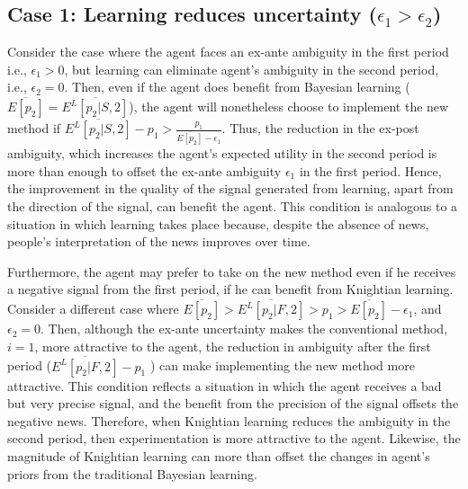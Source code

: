 \documentclass[11pt]{article} %
\theoremstyle{exampstyle}
\begin{document}
\subsection{Case 1: Learning reduces uncertainty ($\epsilon_1 > \epsilon_2$)}
Consider the case where the agent faces an ex-ante ambiguity in the first period i.e., $\epsilon_1 > 0$, but learning can eliminate agent's ambiguity in the second period, i.e., $\epsilon_2 = 0$. Then, even if the agent does benefit from Bayesian learning ($\overline{E[p_2]} = \overline{E^L[p_2|S,2]}$), the agent will nonetheless choose to implement the new method if $\overline{E^L[p_2|S,2]} - p_1 > \frac{p_1}{\overline{E[p_2]} - \epsilon_1}$. Thus, the reduction in the ex-post ambiguity, which increases the agent's expected utility in the second period is more than enough to offset the ex-ante ambiguity $\epsilon_1$ in the first period. Hence, the improvement in the quality of the signal generated from learning, apart from the direction of the signal, can benefit the agent. This condition is analogous to a situation in which learning takes place because, despite the absence of news, people's interpretation of the news improves over time.

Furthermore, the agent may prefer to take on the new method even if he receives a negative signal from the first period, if he can benefit from Knightian learning. Consider a different case where $\overline{E[p_2]} >\overline{E^L[p_2|F,2]} > p_1 > \overline{E[p_2]} - \epsilon_1$, and $\epsilon_2=0$. Then, although the ex-ante uncertainty makes the conventional method, $i=1$, more attractive to the agent, the reduction in ambiguity after the first period ($\overline{E^L[p_2|F,2]} - p_1$ ) can make implementing the new method more attractive. This condition reflects a situation in which the agent receives a bad but very precise signal, and the benefit from the precision of the signal offsets the negative news. Therefore, when Knightian learning reduces the ambiguity in the second period, then experimentation is more attractive to the agent. Likewise, the magnitude of Knightian learning can more than offset the changes in agent's priors from the traditional Bayesian learning.
\end{document}
